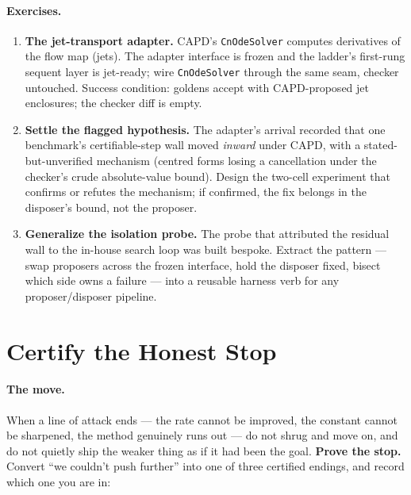 \paragraph{Exercises.}
\begin{enumerate}
\item \textbf{The jet-transport adapter.} CAPD's \texttt{CnOdeSolver}
  computes derivatives of the flow map (jets). The adapter interface is
  frozen and the ladder's first-rung sequent layer is jet-ready; wire
  \texttt{CnOdeSolver} through the same seam, checker untouched.
  Success condition: goldens accept with CAPD-proposed jet enclosures;
  the checker diff is empty.
\item \textbf{Settle the flagged hypothesis.} The adapter's arrival
  recorded that one benchmark's certifiable-step wall moved
  \emph{inward} under CAPD, with a stated-but-unverified mechanism
  (centred forms losing a cancellation under the checker's crude
  absolute-value bound). Design the two-cell experiment that confirms
  or refutes the mechanism; if confirmed, the fix belongs in the
  disposer's bound, not the proposer.
\item \textbf{Generalize the isolation probe.} The probe that
  attributed the residual wall to the in-house search loop was built
  bespoke. Extract the pattern --- swap proposers across the frozen
  interface, hold the disposer fixed, bisect which side owns a failure
  --- into a reusable harness verb for any proposer/disposer pipeline.
\end{enumerate}

\section{Certify the Honest Stop}
\label{sec:ckbk-honest-stop}

\paragraph{The move.} When a line of attack ends --- the rate cannot be
improved, the constant cannot be sharpened, the method genuinely runs
out --- do not shrug and move on, and do not quietly ship the weaker
thing as if it had been the goal. \textbf{Prove the stop.} Convert ``we
couldn't push further'' into one of three certified endings, and record
which one you are in:


